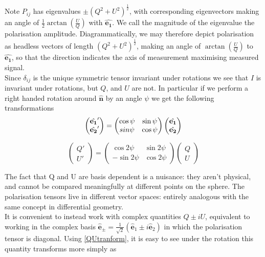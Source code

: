 \documentclass[a4paper,10pt]{article}
\renewcommand{\v}[1]{\mathbf{#1}}
\newcommand{\half}{\frac{1}{2}}
\newcommand{\unit}[1]{\hat{\v{#1}}}
\begin{document}
Note $P_{ij}$ has eigenvalues $\pm (Q^2 + U^2)^\half$, with corresponding eigenvectors making an angle of $\half\arctan(\frac{U}{Q})$ with $\unit{e_1}$. We call the magnitude of the eigenvalue the polarisation amplitude. Diagrammatically, we may therefore depict polarisation as headless vectors of length $(Q^2 + U^2)^\half$, making an angle of $\arctan(\frac{U}{Q})$ to $\unit{e_1}$, so that the direction indicates the axis of measurement maximising measured signal.\\
Since $\delta_{ij}$ is the unique symmetric tensor invariant under rotations we see that $I$ is invariant under rotations, but $Q$, and $U$ are not. In particular if we perform a right handed rotation around $\unit{n}$ by an angle $\psi$ we get the following transformations
\begin{equation}
\begin{pmatrix}
\unit{e_1}'\\
\unit{e_2}' 
\end{pmatrix}
=
\begin{pmatrix}
\cos{\psi} & \sin{\psi}\\ 
\-sin{\psi} & \cos{\psi}
\end{pmatrix}
\begin{pmatrix}
\unit{e_1}\\
\unit{e_2} 
\end{pmatrix}
\end{equation}


\begin{equation}
\begin{pmatrix}
Q'\\
U' 
\end{pmatrix}
=
\begin{pmatrix}
\cos{2\psi} & \sin{2\psi}\\ 
-\sin{2\psi} & \cos{2\psi}
\end{pmatrix}
\begin{pmatrix}
Q\\
U
\end{pmatrix}
\label{QUtranform}
\end{equation}

The fact that Q and U are basis dependent is a nuisance:  they aren't physical, and cannot be compared meaningfully at different points on the sphere. The polarisation tensors live in different vector spaces: entirely analogous with the same concept in differential geometry. \\

It is convenient to instead work with complex quantities $Q\pm iU$, equivalent to working in the complex basis $\unit{e}_\pm = \frac{1}{\sqrt{2}}(\unit{e}_1 \pm i\unit{e}_2)$ in which the polarisation tensor is diagonal. Using \ref{QUtranform}, it is easy to see under the rotation this quantity transforms more simply as
\end{document}
